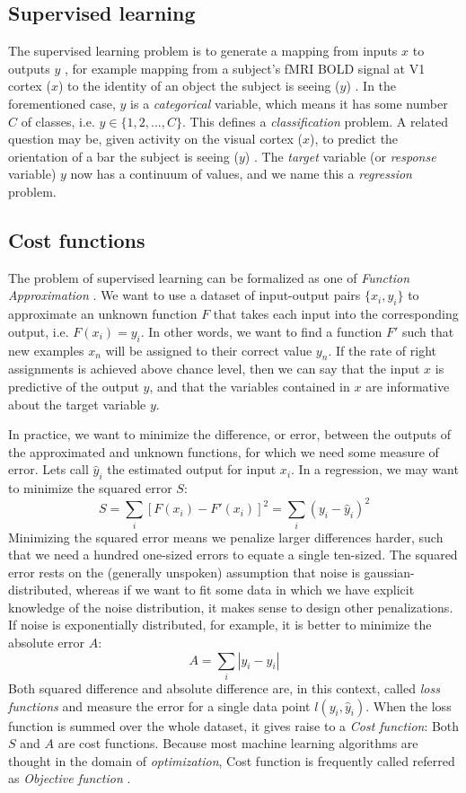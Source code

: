 \subsection{Supervised learning}
\label{sub:ml}
The supervised learning problem is to generate a mapping from inputs $x$ to outputs $y$ \cite{murphy2012machine}, for example mapping from a subject's fMRI BOLD signal at V1 cortex ($x$) to the identity of an object the subject is seeing ($y$) \cite{dubois2015single}. In the forementioned case, $y$ is a \textit{categorical} variable, which means it has some number $C$ of classes, i.e. $y \in \{1,2,...,C\}$. This defines a \textit{classification} problem. 
A related question may be, given activity on the visual cortex ($x$), to predict the orientation of a bar the subject is seeing ($y$) \cite{carlson2014orientation}. The \textit{target} variable (or \textit{response} variable) $y$ now has a continuum of values, and we name this a \textit{regression} problem.

\subsection{Cost functions}
The problem of supervised learning can be formalized as one of \textit{Function Approximation} \cite{murphy2012machine}. We want to use a dataset of input-output pairs $\{x_i, y_i\}$ to approximate an unknown function $F$ that takes each input into the corresponding output, i.e. $F(x_i) = y_i$. In other words, we want to find a function $F'$ such that new examples $x_n$ will be assigned to their correct value $y_n$. If the rate of right assignments is achieved above chance level, then we can say that the input $x$ is predictive of the output $y$, and that the variables contained in $x$ are informative about the target variable $y$. 

In practice, we want to minimize the difference, or error, between the outputs of the approximated and unknown functions, for which we need some measure of error. Lets call $\hat{y}_i$ the estimated output for input $x_i$. In a regression, we may want to minimize the squared error $S$:
$$ S = \sum_i [F(x_i)-F'(x_i)]^2 = \sum_i (y_i-\hat{y}_i)^2 $$
Minimizing the squared error means we penalize larger differences harder, such that we need a hundred one-sized errors to equate a single ten-sized. The squared error rests on the (generally unspoken) assumption that noise is gaussian-distributed, whereas if we want to fit some data in which we have explicit knowledge of the noise distribution, it makes sense to design other penalizations. If noise is exponentially distributed, for example, it is better to minimize the absolute error $A$:
$$ A = \sum_i |y_i-\hat{y}_i| $$
Both squared difference and absolute difference are, in this context, called \textit{loss functions} and measure the error for a single data point $l(y_i, \hat{y}_i)$. When the loss function is summed over the whole dataset, it gives raise to a \textit{Cost function}: Both $S$ and $A$ are cost functions. Because most machine learning algorithms are thought in the domain of \textit{optimization}, Cost function is frequently called referred as \textit{Objective function} \cite[p~79]{goodfellow2016deep}.

